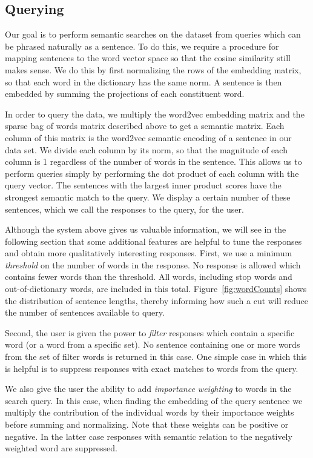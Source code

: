\documentclass{sigchi}
\begin{document}
\subsection{Querying}

Our goal is to perform semantic searches on the dataset from queries which can be phrased naturally as a sentence. To do this, we require a procedure for mapping sentences to the word vector space so that the cosine similarity still makes sense. We do this by first normalizing the rows of the embedding matrix, so that each word in the dictionary has the same norm. A sentence is then embedded by summing the projections of each constituent word. 

In order to query the data, we multiply the word2vec embedding matrix and the sparse bag of words matrix described above to get a semantic matrix. Each column of this matrix is the word2vec semantic encoding of a sentence in our data set. We divide each column by its norm, so that the magnitude of each column is 1 regardless of the number of words in the sentence. This allows us to perform queries simply by performing the dot product of each column with the query vector. The sentences with the largest inner product scores have the strongest semantic match to the query. We display a certain number of these sentences, which we call the responses to the query, for the user.

Although the system above gives us valuable information, we will see in the following section that some additional features are helpful to tune the responses and obtain more qualitatively interesting responses. First, we use a minimum {\em threshold} on the number of words in the response. No response is allowed which contains fewer words than the threshold. All words, including stop words and out-of-dictionary words, are included in this total. Figure~\ref{fig:wordCounts} shows the distribution of sentence lengths, thereby informing how such a cut will reduce the number of sentences available to query. 

Second, the user is given the power to {\em filter} responses which contain a specific word (or a word from a specific set). No sentence  containing one or more words from the set of filter words is returned in this case. One simple case in which this is helpful is to suppress responses with exact matches to words from the query.

We also give the user the ability to add {\em importance weighting} to words in the search query. In this case, when finding the embedding of the query sentence we multiply the contribution of the individual words by their importance weights before summing and normalizing. Note that these weights can be positive or negative. In the latter case responses with semantic relation to the negatively weighted word are suppressed.
\end{document}
